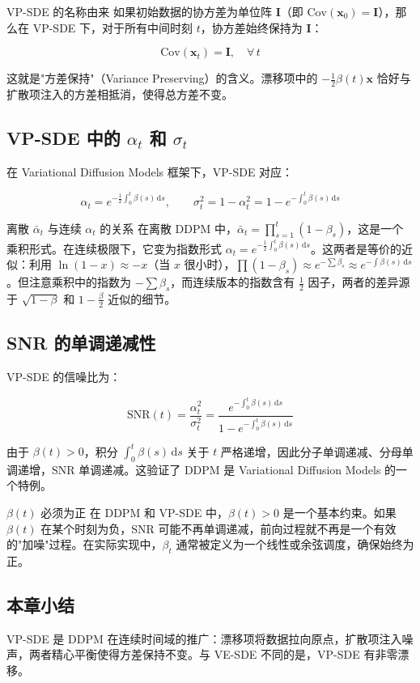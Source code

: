 \begin{importantbox}{VP-SDE 的名称由来}
如果初始数据的协方差为单位阵 $\mathbf{I}$（即 $\mathrm{Cov}(\mathbf{x}_0) = \mathbf{I}$），那么在 VP-SDE 下，对于所有中间时刻 $t$，协方差始终保持为 $\mathbf{I}$：

$$
\mathrm{Cov}(\mathbf{x}_t) = \mathbf{I}, \quad \forall\, t
$$

这就是"方差保持"（Variance Preserving）的含义。漂移项中的 $-\frac{1}{2}\beta(t)\mathbf{x}$ 恰好与扩散项注入的方差相抵消，使得总方差不变。
\end{importantbox}

\subsection{VP-SDE 中的 $\alpha_t$ 和 $\sigma_t$}

在 Variational Diffusion Models 框架下，VP-SDE 对应：

$$
\alpha_t = e^{-\frac{1}{2}\int_0^t \beta(s)\,\mathrm{d}s}, \qquad \sigma_t^2 = 1 - \alpha_t^2 = 1 - e^{-\int_0^t \beta(s)\,\mathrm{d}s}
$$

\begin{knowledgebox}{离散 $\bar{\alpha}_t$ 与连续 $\alpha_t$ 的关系}
在离散 DDPM 中，$\bar{\alpha}_t = \prod_{s=1}^t (1-\beta_s)$，这是一个乘积形式。在连续极限下，它变为指数形式 $\alpha_t = e^{-\frac{1}{2}\int_0^t \beta(s)\,\mathrm{d}s}$。这两者是等价的近似：利用 $\ln(1-x) \approx -x$（当 $x$ 很小时），$\prod(1-\beta_s) \approx e^{-\sum \beta_s} \approx e^{-\int \beta(s)\,\mathrm{d}s}$。但注意乘积中的指数为 $-\sum \beta_s$，而连续版本的指数含有 $\frac{1}{2}$ 因子，两者的差异源于 $\sqrt{1-\beta}$ 和 $1-\frac{\beta}{2}$ 近似的细节。
\end{knowledgebox}

\subsection{SNR 的单调递减性}

VP-SDE 的信噪比为：

$$
\mathrm{SNR}(t) = \frac{\alpha_t^2}{\sigma_t^2} = \frac{e^{-\int_0^t \beta(s)\,\mathrm{d}s}}{1 - e^{-\int_0^t \beta(s)\,\mathrm{d}s}}
$$

由于 $\beta(t) > 0$，积分 $\int_0^t \beta(s)\,\mathrm{d}s$ 关于 $t$ 严格递增，因此分子单调递减、分母单调递增，SNR 单调递减。这验证了 DDPM 是 Variational Diffusion Models 的一个特例。

\begin{warningbox}{$\beta(t)$ 必须为正}
在 DDPM 和 VP-SDE 中，$\beta(t) > 0$ 是一个基本约束。如果 $\beta(t)$ 在某个时刻为负，SNR 可能不再单调递减，前向过程就不再是一个有效的"加噪"过程。在实际实现中，$\beta_t$ 通常被定义为一个线性或余弦调度，确保始终为正。
\end{warningbox}

\subsection{本章小结}

VP-SDE 是 DDPM 在连续时间域的推广：漂移项将数据拉向原点，扩散项注入噪声，两者精心平衡使得方差保持不变。与 VE-SDE 不同的是，VP-SDE 有非零漂移。


